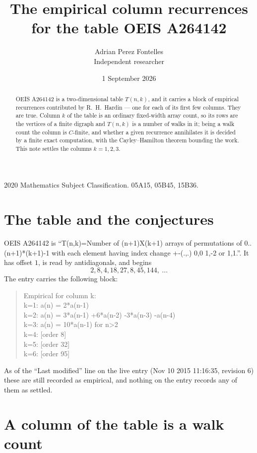 \documentclass[11pt,a4paper]{article}
\title{The empirical column recurrences for the table OEIS A264142}
\author{Adrian Perez Fontelles\\ \small Independent researcher}
\date{1 September 2026}
\theoremstyle{plain}
\theoremstyle{definition}
\begin{document}
\maketitle

\begin{abstract}
OEIS A264142 is a two-dimensional table $T(n,k)$, and it carries a block of empirical
recurrences contributed by R.~H.~Hardin --- one for each of its first few columns. They are
true. Column $k$ of the table is an ordinary fixed-width array count, so its rows are the
vertices of a finite digraph and $T(n,k)$ is a number of walks in it; being a walk count the
column is $C$-finite, and whether a given recurrence annihilates it is decided by a finite
exact computation, with the Cayley--Hamilton theorem bounding the work. This note settles the columns $k=1, 2, 3$.
\end{abstract}

\noindent\small 2020 Mathematics Subject Classification. 05A15, 05B45, 15B36.\normalsize

\section{The table and the conjectures}

OEIS A264142 is ``T(n,k)=Number of (n+1)X(k+1) arrays of permutations of 0..(n+1)*(k+1)-1 with each element having index change +-(.,.) 0,0 1,-2 or 1,1.''. It has offset $1$, is
read by antidiagonals, and begins
\[
2, 8, 4, 18, 27, 8, 45, 144,\ \dots
\]
The entry carries the following block:
\begin{quote}\small
Empirical for column k:\\
k=1: a(n) = 2*a(n-1)\\
k=2: a(n) = 3*a(n-1) +6*a(n-2) -3*a(n-3) -a(n-4)\\
k=3: a(n) = 10*a(n-1) for n>2\\
k=4: [order 8]\\
k=5: [order 32]\\
k=6: [order 95]\\
\end{quote}
As of the ``Last modified'' line on the live entry (Nov 10 2015 11:16:35, revision 6) these are still
recorded as empirical, and nothing on the entry records any of them as settled.

\section{A column of the table is a walk count}
\end{document}
